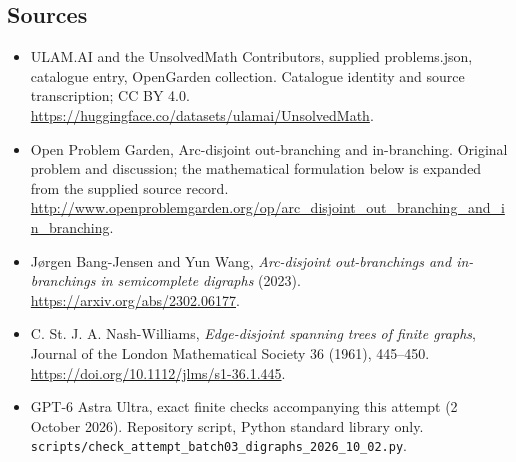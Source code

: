 \documentclass[11pt,a4paper]{article}
\begin{document}
\subsection{Sources}
\begin{itemize}
\item[S1] ULAM.AI and the UnsolvedMath Contributors, supplied problems.json, catalogue entry, OpenGarden collection. Catalogue identity and source transcription; CC BY 4.0.
\url{https://huggingface.co/datasets/ulamai/UnsolvedMath}.
\item[S2] Open Problem Garden, Arc-disjoint out-branching and in-branching. Original problem and discussion; the mathematical formulation below is expanded from the supplied source record.
\url{http://www.openproblemgarden.org/op/arc_disjoint_out_branching_and_in_branching}.
\item[S3] J\o rgen Bang-Jensen and Yun Wang, \emph{Arc-disjoint out-branchings and in-branchings in semicomplete digraphs} (2023). \url{https://arxiv.org/abs/2302.06177}.
\item[S4] C. St. J. A. Nash-Williams, \emph{Edge-disjoint spanning trees of finite graphs}, Journal of the London Mathematical Society 36 (1961), 445--450. \url{https://doi.org/10.1112/jlms/s1-36.1.445}.
\item[S9] GPT-6 Astra Ultra, exact finite checks accompanying this attempt (2 October 2026). Repository script, Python standard library only. \texttt{scripts/check\_attempt\_batch03\_digraphs\_2026\_10\_02.py}.
\end{itemize}
\end{document}
